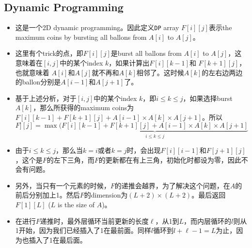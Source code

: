 \subsection{Dynamic Programming}
\begin{itemize}
\item 这是一个2D dynamic programming。因此定义\texttt{DP} array $F[i][j]$表示the maximum coins by bursting all ballons from $ A[i] $ to $ A[j] $。
\item 这里有个trick的点，即$F[i][j]$是burst all ballons from $ A[i] $ to $ A[j] $，这意味着在$ [i,j] $中的某个index $ k $，如果计算出$ F[i][k-1] $和 $ F[k+1][j] $，也就意味着 $ A[i] $和$ A[j] $就不再和$ A[k] $相邻了。这时候$ A[k] $的左右边两边的ballon分别是$ A[i-1] $和$ A[j+1] $了。
\item 基于上述分析，对于$ [i,j] $中的某个index $ k $，即$ i\leq k\leq j $，如果选择burst $A[k]$，那么所获得的maximum coins为$F[i][k-1] + F[k+1][j] + A[i-1]\times A[k]\times A[j+1]$。所以$ F][j] = \max(\underbrace{F[i][k-1] + F[k+1][j] + A[i-1]\times A[k]\times A[j+1]}_{i\leq k\leq j}$
\item 由于$i\leq k\leq j$，那么当$k=i$或者$k=j$时，会出现$ F[i][i-1] $和$ F[j+1][j] $，这个是$F$的左下三角，而$ F $的更新都在有上三角，初始化时都设为零，因此不会有问题。
\item 另外，当只有一个元素的时候，$ F $的递推会越界，为了解决这个问题，在$ A $的前后分别加上1。然后$F$的dimension为$ (L+2)\times(L+2) $。最后返回$F[1][L]$ ($ L $ is the size of $ A $)。
\item 在进行$ F $递推时，最外层循环当前更新的长度$ \ell $，从1到$ L $，而内层循环的$l$则从1开始，因为我们已经插入了1在最前面。同样$ l $循环到$l+\ell-1 = L$为止，因为也插入了1在最后面。
\end{itemize}
\setcounter{lstlisting}{0}

